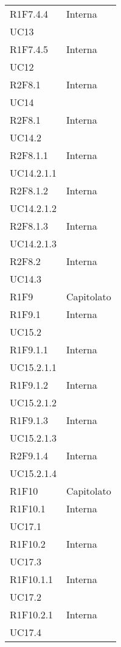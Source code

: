 \begin{longtable}{|C{6.5cm}|C{6.5cm}|}
	R1F7.4.4 &  \centering Interna \\ UC13 \tabularnewline

	R1F7.4.5 & \centering Interna \\ UC12 \tabularnewline

	R2F8.1 & \centering Interna \\ UC14 \tabularnewline

	R2F8.1 & \centering Interna \\ UC14.2 \tabularnewline

	R2F8.1.1 & \centering Interna \\ UC14.2.1.1 \tabularnewline

	R2F8.1.2 & \centering Interna \\ UC14.2.1.2 \tabularnewline

	R2F8.1.3 & \centering Interna \\ UC14.2.1.3 \tabularnewline


	R2F8.2 & \centering Interna \\ UC14.3 \tabularnewline

	R1F9 &  Capitolato \\

	R1F9.1 & \centering Interna \\ UC15.2 \tabularnewline

	R1F9.1.1 & \centering Interna \\ UC15.2.1.1 \tabularnewline

	R1F9.1.2 & \centering Interna \\ UC15.2.1.2 \tabularnewline

	R1F9.1.3 & \centering Interna \\ UC15.2.1.3 \tabularnewline

	R2F9.1.4 & \centering Interna \\ UC15.2.1.4 \tabularnewline

	R1F10 & Capitolato \\

	R1F10.1 &  \centering Interna \\ UC17.1 \tabularnewline

	R1F10.2 & \centering Interna \\ UC17.3 \tabularnewline

	R1F10.1.1 &  \centering Interna \\ UC17.2 \tabularnewline

	R1F10.2.1 &  \centering Interna \\ UC17.4 \tabularnewline


\end{longtable}
